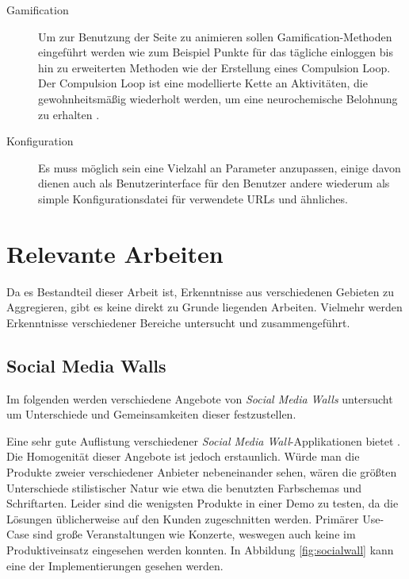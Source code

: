 \documentclass[12pt,twoside]{book}
\begin{document}
\begin{description}
\item[Gamification]
  Um zur Benutzung der Seite zu animieren sollen Gamification-Methoden eingeführt werden wie zum Beispiel Punkte für das tägliche einloggen bis hin zu erweiterten Methoden wie der Erstellung eines Compulsion Loop. Der Compulsion Loop ist eine modellierte Kette an Aktivitäten, die gewohnheitsmäßig wiederholt werden, um eine neurochemische Belohnung zu erhalten \cite{gamasutra}.

\item[Konfiguration]
  Es muss möglich sein eine Vielzahl an Parameter anzupassen, einige davon dienen auch als Benutzerinterface für den Benutzer andere wiederum als simple Konfigurationsdatei für verwendete URLs und ähnliches.

\end{description}

\section{Relevante Arbeiten}

Da es Bestandteil dieser Arbeit ist, Erkenntnisse aus verschiedenen Gebieten zu Aggregieren, gibt es keine direkt zu Grunde liegenden Arbeiten. Vielmehr werden Erkenntnisse verschiedener Bereiche untersucht und zusammengeführt.

\subsection{Social Media Walls}

Im folgenden werden verschiedene Angebote von \textit{Social Media Walls} untersucht um Unterschiede und Gemeinsamkeiten dieser festzustellen.

Eine sehr gute Auflistung verschiedener \textit{Social Media Wall}-Applikationen bietet \citep{hofram}. Die Homogenität dieser Angebote ist jedoch erstaunlich. Würde man die Produkte zweier verschiedener Anbieter nebeneinander sehen, wären die größten Unterschiede stilistischer Natur wie etwa die benutzten Farbschemas und Schriftarten. Leider sind die wenigsten Produkte in einer Demo zu testen, da die Lösungen üblicherweise auf den Kunden zugeschnitten werden. Primärer Use-Case sind große Veranstaltungen wie Konzerte, weswegen auch keine im Produktiveinsatz eingesehen werden konnten. In Abbildung \ref{fig:socialwall} kann eine der Implementierungen gesehen werden.\\
\end{document}
